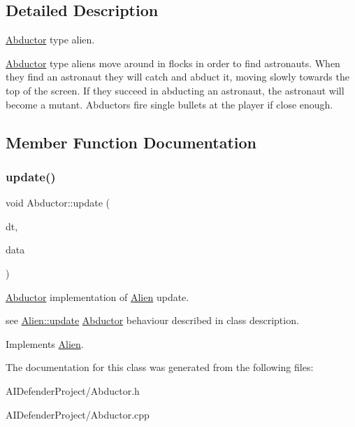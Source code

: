 \subsection{Detailed Description}
\hyperlink{class_abductor}{Abductor} type alien. 

\hyperlink{class_abductor}{Abductor} type aliens move around in flocks in order to find astronauts. When they find an astronaut they will catch and abduct it, moving slowly towards the top of the screen. If they succeed in abducting an astronaut, the astronaut will become a mutant. Abductors fire single bullets at the player if close enough. 

\subsection{Member Function Documentation}
\mbox{\label{class_abductor_a0a3080d1631319a1bf890cd0f08935a2}} 
\subsubsection{\texorpdfstring{update()}{update()}}
{\footnotesize\ttfamily void Abductor\+::update (\begin{DoxyParamCaption}\item[{float}]{dt,  }\item[{\hyperlink{class_alien_manager}{Alien\+Manager} $\ast$}]{data }\end{DoxyParamCaption})\hspace{0.3cm}{\ttfamily [virtual]}}



\hyperlink{class_abductor}{Abductor} implementation of \hyperlink{class_alien}{Alien} update. 

see \hyperlink{class_alien_afdf9627be2ad37372174a250540dd47b}{Alien\+::update} \hyperlink{class_abductor}{Abductor} behaviour described in class description. 

Implements \hyperlink{class_alien_afdf9627be2ad37372174a250540dd47b}{Alien}.



The documentation for this class was generated from the following files\+:\begin{DoxyCompactItemize}
\item 
A\+I\+Defender\+Project/Abductor.\+h\item 
A\+I\+Defender\+Project/Abductor.\+cpp\end{DoxyCompactItemize}
